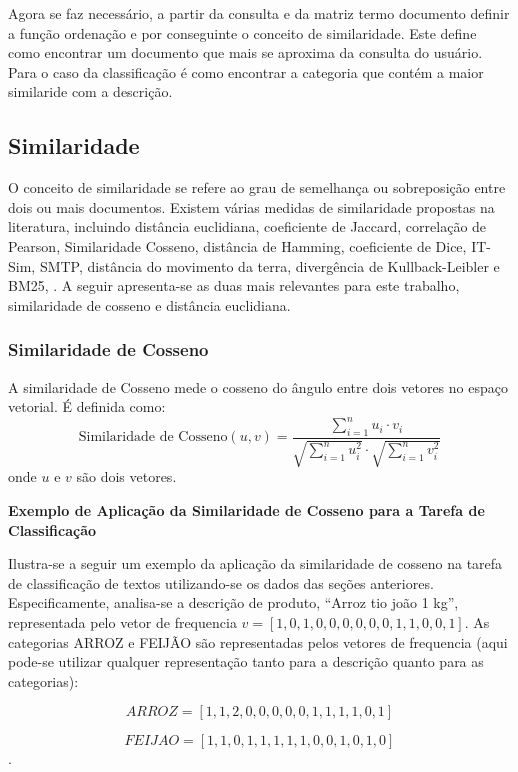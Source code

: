 Agora se faz necessário, a partir da consulta e da matriz termo documento definir a função ordenação e por conseguinte o conceito de similaridade.  Este define como encontrar um documento que mais se aproxima da consulta do usuário.  Para o caso da classificação é como encontrar a categoria que contém a maior similaride com a descrição.


\subsection{Similaridade}

O conceito de similaridade se refere ao grau de semelhança ou sobreposição entre dois ou mais documentos. Existem várias medidas de similaridade propostas na literatura, incluindo distância euclidiana, coeficiente de Jaccard, correlação de Pearson, Similaridade Cosseno, distância de Hamming, coeficiente de Dice, IT-Sim, SMTP, distância do movimento da terra, divergência de Kullback-Leibler e BM25, \cite{deng2019feature}.  A seguir apresenta-se as duas mais relevantes para este trabalho, similaridade de cosseno e distância euclidiana.  

\subsubsection{Similaridade de Cosseno}
A similaridade de Cosseno mede o cosseno do ângulo entre dois vetores no espaço vetorial. É definida como:
\begin{equation}
    \text{Similaridade de Cosseno}(u,v) = \frac{\sum_{i=1}^{n} u_i \cdot v_i}{\sqrt{\sum_{i=1}^{n} u_i^2} \cdot \sqrt{\sum_{i=1}^{n} v_i^2}}
\end{equation}
onde $u$ e $v$ são dois vetores.

\textbf{Exemplo de Aplicação da Similaridade de Cosseno para a Tarefa de Classificação}

Ilustra-se a seguir um exemplo da aplicação da similaridade de cosseno na tarefa de classificação de textos utilizando-se os dados das seções anteriores. Especificamente, analisa-se a descrição de produto, ``Arroz tio joão 1 kg'', representada pelo vetor de frequencia \(v = [1,0,1,0,0,0,0,0,0,1,1,0,0,1]\). As categorias ARROZ e FEIJÃO são representadas pelos vetores de frequencia (aqui pode-se utilizar qualquer representação tanto para a descrição quanto para as categorias):

\[ARROZ = [1,1,2,0,0,0,0,0,1,1,1,1,0,1]\] 

\[FEIJAO = [1,1,0,1,1,1,1,1,0,0,1,0,1,0]\].

